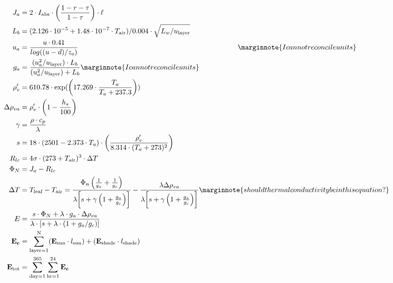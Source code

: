 \documentclass[10pt]{article}
\begin{document}
\begin{align}
 J_a &= 2 \cdot I_{\text{abs}} \cdot \left(\frac{1-r-\tau}{1-\tau}\right) \cdot \ell \label{eqn:Ja} \\
 L_b &= (2.126 \cdot 10^{-5} + 1.48 \cdot 10^{-7} \cdot T_\text{air}) / 0.004 \cdot \sqrt{L_w / u_{\text{layer}}} \label{eqn:Lb}\\
 u_a &= \frac{u \cdot 0.41}{log((u-d)/z_o)} \hspace{3.1in} \label{eqn:ua} \marginnote{I can not reconcile units}\\
 g_a &= \frac{(u_{a}^{2}/u_{\text{layer}}) \cdot L_b}{(u_{a}^{2}/u_{\text{layer}}) + L_b} \label{eqn:ga} \marginnote{I can not reconcile units}\\
 \rho_{v}^{\prime} &= 610.78 \cdot \exp(\left( 17.269 \cdot \frac{T_a}{T_a + 237.3} \right)) \label{eqn:rhop} \\
 \Delta \rho_{va} &= \rho_{v}^{\prime} \cdot \left( 1-\frac{h_s}{100} \right) \label{eqn:Deltarho} \\
 \gamma &= \frac{\rho \cdot c_p}{\lambda} \label{eqn:gamma} \\
 s &= 18 \cdot (2501 - 2.373 \cdot T_a) \cdot \left(\frac{\rho_{v}^{\prime}}{8.314 \cdot (T_a + 273)^2} \right) \label{eqn:s} \\
 R_{lc} &= 4 \sigma \cdot (273+T_{\text{air}})^3 \cdot \Delta T \label{eqn:Rlc} \\
 \Phi_N &= J_a - R_{lc} \label{eqn:PhiN} \\
 \Delta T &= T_{\text{leaf}} - T_{\text{air}} = \frac{\Phi_n \left(\frac{1}{g_a}+\frac{1}{g_c} \right)}{\lambda \biggl[ s+ \gamma \left( 1 + \frac{g_a}{g_c} \right) \biggr]} - \frac{\lambda \Delta \rho_{va}}{\lambda \biggl[ s+\gamma\left(1+\frac{g_a}{g_c}\right) \biggr] } \label{eqn:DeltaT} \marginnote{should thermal conductivity be in this equation?} \\
 E &= \frac{ s \cdot \Phi_N + \lambda \cdot g_a \cdot \Delta \rho_{va}}{\lambda \cdot [ s + \lambda \cdot (1+g_a / g_c)]} \label{eqn:E} \\
 \mathbf{E_c} &= \sum_{\text{layer}=1}^\text{N} (\mathbf{E_{\text{sun}}} \cdot l_{\text{sun}}) + (\mathbf{E_{\text{shade}}} \cdot l_{\text{shade}}) \label{eqn:Ec}\\ 
 \mathbf{E_{\text{tot}}} &= \sum_{\text{day}=1}^{365}\sum_{\text{hr}=1}^{24}  \mathbf{E_c} \label{eqn:Etot}
\end{align}
\end{document}
